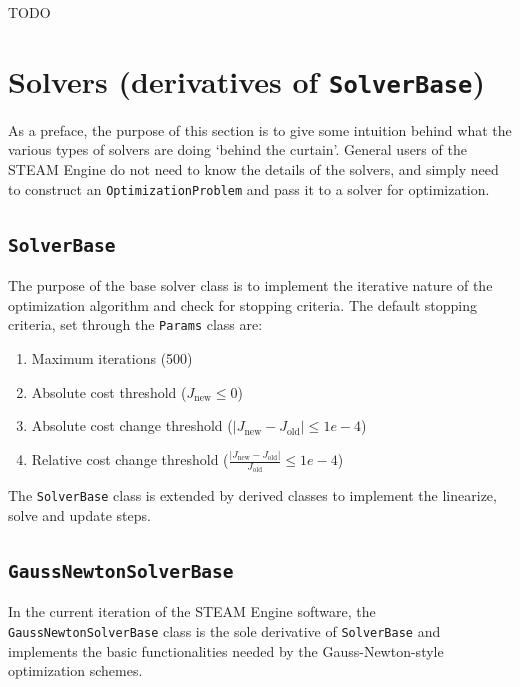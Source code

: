 \documentclass[10pt,letterpaper,fleqn,oneside]{article}
\newcommand{\code}[1]{\texttt{#1}}
\begin{document}
TODO

%
%
\section{Solvers (derivatives of \code{SolverBase})}
\label{sec:solvers}

As a preface, the purpose of this section is to give some intuition behind what the various types of solvers are doing `behind the curtain'. 
General users of the STEAM Engine do not need to know the details of the solvers, and simply need to construct an \code{OptimizationProblem} and pass it to a solver for optimization.

\subsection{\code{SolverBase}}

The purpose of the base solver class is to implement the iterative nature of the optimization algorithm and check for stopping criteria.
The default stopping criteria, set through the \code{Params} class are:
%
\begin{enumerate}
	\item Maximum iterations (500)
	\item Absolute cost threshold ($J_\text{new} \leq 0$)
	\item Absolute cost change threshold ($|J_\text{new} - J_\text{old}| \leq 1e-4$)
	\item Relative cost change threshold ($\frac{|J_\text{new} - J_\text{old}|}{J_\text{old}} \leq 1e-4$)
\end{enumerate}
% 
The \code{SolverBase} class is extended by derived classes to implement the linearize, solve and update steps.

\subsection{\code{GaussNewtonSolverBase}}

In the current iteration of the STEAM Engine software, the \code{GaussNewtonSolverBase} class is the sole derivative of \code{SolverBase} and implements the basic functionalities needed by the Gauss-Newton-style optimization schemes.
\end{document}
